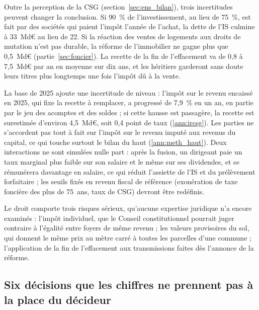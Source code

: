 Outre la perception de la CSG (section~\ref{sec:ens_bilan}), trois incertitudes peuvent changer la conclusion. Si 90~\%
de l'investissement, au lieu de 75~\%, est fait par des sociétés qui paient l'impôt l'année de l'achat, la dette de l'IS
culmine à 33~Md€ au lieu de 22. Si la réaction des ventes de logements aux droits de mutation n'est pas durable, la
réforme de l'immobilier ne gagne plus que 0,5~Md€ (partie~\ref{sec:foncier}). La recette de la fin de l'effacement va de
0,8 à 7,5~Md€ par an en moyenne sur dix ans, et les héritiers garderont sans doute leurs titres plus longtemps une fois
l'impôt dû à la vente.

La base de 2025 ajoute une incertitude de niveau : l'impôt sur le revenu encaissé en 2025, qui fixe la recette à
remplacer, a progressé de 7,9~\% en un an, en partie par le jeu des acomptes et des soldes ; si cette hausse est
passagère, la recette est surestimée d'environ 4,5~Md€, soit 0,4 point de taux (\ref{ann:ircsg}). Les parties ne
s'accordent pas tout à fait sur l'impôt sur le revenu imputé aux revenus du capital, ce qui touche surtout le bilan du
haut (\ref{ann:meth_haut}). Deux interactions ne sont simulées nulle part : après la fusion, un dirigeant paie un
taux marginal plus faible sur son salaire et le même sur ses dividendes, et se rémunérera davantage en salaire, ce qui
réduit l'assiette de l'IS et du prélèvement forfaitaire ; les seuils fixés en revenu fiscal de référence (exonération
de taxe foncière des plus de 75~ans, taux de CSG) devront être redéfinis.

Le droit comporte trois risques sérieux, qu'aucune expertise juridique n'a encore examinés : l'impôt individuel, que le
Conseil constitutionnel pourrait juger contraire à l'égalité entre foyers de même revenu ; les valeurs provisoires du
sol, qui donnent le même prix au mètre carré à toutes les parcelles d'une commune ; l'application de la fin de
l'effacement aux transmissions faites dès l'annonce de la réforme.

\subsection{Six décisions que les chiffres ne prennent pas à la place du décideur}\label{sec:ens_decisions}

